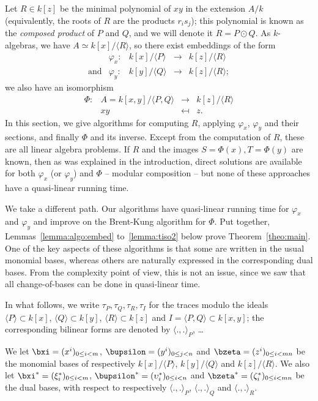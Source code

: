 \documentclass{sig-alternate}
\newcounter{algo}
\newcommand{\ang}[1]{\langle#1\rangle}
\begin{document}
Let $R \in k[z]$ be the minimal polynomial of $xy$ in the extension
$A/k$ (equivalently, the roots of $R$ are the products $r_i s_j$);
this polynomial is known as the {\em composed product} of $P$ and $Q$,
and we will denote it $R = P \odot Q$. As $k$-algebras, we have $A
\simeq k[x]/\ang{R}$, so there exist embeddings of the form
$$
\begin{array}{ccccc}
&\varphi_x: & k[x]/\ang{P} & \to & k[z]/\ang{R}\\[2mm]
\text{and} & \varphi_y: & k[y]/\langle Q \rangle & \to & k[z]/\ang{R};
\end{array}
$$
we also have an isomorphism 
$$\begin{array}{cccc} 
\Phi:&  A=k[x,y]/\langle P,Q\rangle & \to & k[z]/\ang{R} \\
&  xy & \mapsfrom & z.
\end{array}$$
In this section, we give algorithms for computing $R$, applying
$\varphi_x$, $\varphi_y$ and their sections, and finally $\Phi$ and its inverse. Except from the
computation of $R$, these are all linear algebra problems. If $R$ and
the images $S=\Phi(x),T=\Phi(y)$ are known, then as was explained in
the introduction, direct solutions are available for both $\varphi_x$
(or $\varphi_y$) and $\Phi$ -- modular composition -- but none of
these approaches have a quasi-linear running time.

We take a different path. Our algorithms have quasi-linear running
time for $\varphi_x$ and $\varphi_y$ and improve on the Brent-Kung
algorithm for $\Phi$. Put together, Lemmas~\ref{lemma:algo:embed}
to~\ref{lemma:tiso2} below prove Theorem~\ref{theo:main}. One of the
key aspects of these algorithms is that some are written in the usual
monomial bases, whereas others are naturally expressed in the
corresponding dual bases. From the complexity point of view, this is
not an issue, since we saw that all change-of-bases can be done in
quasi-linear time.

In what follows, we write $\tau_P,\tau_Q,\tau_R,\tau_I$ for the traces
modulo the ideals $\ang{P}\subset k[x]$, $\ang{Q} \subset k[y]$,
$\ang{R} \subset k[z]$ and $I=\ang{P,Q} \subset k[x,y]$; the
corresponding bilinear forms are denoted by $\ang{.,.}_P$, \dots

We let $\bxi=(x^i)_{0 \le i < m}$, $\bupsilon=(y^i)_{0 \le j <
  n}$ and $\bzeta = (z^i)_{0 \le i < mn}$ be the monomial bases of
respectively $k[x]/\ang{P}$, $k[y]/\ang{Q}$ and $k[z]/\ang{R}$. We also let
$\bxi^\ast=(\xi^\ast_i)_{0 \le i <m}$,
$\bupsilon^\ast=(\upsilon^\ast_i)_{0 \le i < n}$ and
$\bzeta^\ast=(\zeta^\ast_i)_{0 \le i < mn}$ be the dual bases, with
respect to respectively $\ang{.,.}_P$, $\ang{.,.}_Q$ and
$\ang{.,.}_R$.
\end{document}
